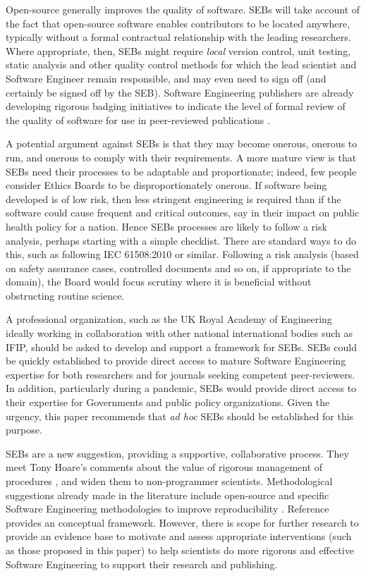 \documentclass{comjnl}
\begin{document}
Open-source generally improves the quality of software. SEBs will take account of the fact that open-source software enables contributors to be located anywhere, typically without a formal contractual relationship with the leading researchers. Where appropriate, then, SEBs might require \emph{local\/} version control, unit testing, static analysis and other quality control methods for which the lead scientist and Software Engineer remain responsible, and may even need to sign off (and certainly be signed off by the SEB\@). Software Engineering publishers are already developing rigorous badging initiatives to indicate the level of formal review of the quality of software for use in peer-reviewed publications \cite{acm-artifacts}.

A potential argument against SEBs is that they may become onerous, onerous to run, and onerous to comply with their requirements. A more mature view is that SEBs need their processes to be adaptable and proportionate; indeed, few people consider Ethics Boards to be disproportionately onerous. If software being developed is of low risk, then less stringent engineering is required than if the software could cause frequent and critical outcomes, say in their impact on public health policy for a nation. Hence SEBs processes are likely to follow a risk analysis, perhaps starting with a simple checklist. There are standard ways to do this, such as following IEC 61508:2010 \cite{redmill,iec61508} or similar. Following a risk analysis (based on safety assurance cases, controlled documents and so on, if appropriate to the domain), the Board would focus scrutiny where it is beneficial without obstructing routine science.

A professional organization, such as the UK Royal Academy of Engineering ideally working in collaboration with other national international bodies such as IFIP, should be asked to develop and support a framework for SEBs. SEBs could be quickly established to provide direct access to mature Software Engineering expertise for both researchers and for journals seeking competent peer-reviewers. In addition, particularly during a pandemic, SEBs would provide direct access to their expertise for Governments and public policy organizations. Given the urgency, this paper recommends that \emph{ad hoc\/} SEBs should be established for this purpose.

SEBs are a new suggestion, providing a supportive, collaborative process. They meet Tony Hoare's comments about the value of rigorous management of procedures \cite{hoare-unreasonable}, and widen them to non-programmer scientists. Methodological suggestions already made in the literature include open-source and specific Software Engineering methodologies to improve reproducibility \cite{basic-reproducibilty,open-source}. Reference \cite{ABCs-SE} provides an conceptual framework. However, there is scope for further research to provide an evidence base to motivate and assess appropriate interventions (such as those proposed in this paper) to help scientists do more rigorous and effective Software Engineering to support their research and publishing. 
\end{document}
